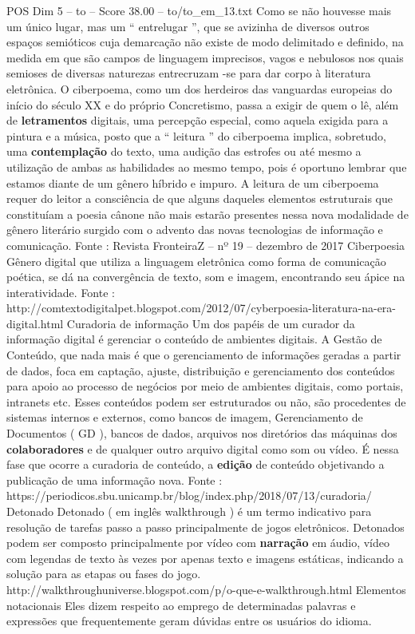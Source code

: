 \begin{textsample}{POS Dim 5 – to – Score 38.00 – to/to\_em\_13.txt}
Como se não houvesse mais um único lugar, mas um “ entrelugar ”, que se avizinha de diversos outros espaços semióticos cuja demarcação não existe de modo delimitado e definido, na medida em que são campos de linguagem imprecisos, vagos e nebulosos nos quais semioses de diversas naturezas entrecruzam -se para dar corpo à literatura eletrônica.
O ciberpoema, como um dos herdeiros das vanguardas europeias do início do século XX e do próprio Concretismo, passa a exigir de quem o lê, além de \textbf{letramentos} digitais, uma percepção especial, como aquela exigida para a pintura e a música, posto que a “ leitura ” do ciberpoema implica, sobretudo, uma \textbf{contemplação} do texto, uma audição das estrofes ou até mesmo a utilização de ambas as habilidades ao mesmo tempo, pois é oportuno lembrar que estamos diante de um gênero híbrido e impuro.
A leitura de um ciberpoema requer do leitor a consciência de que alguns daqueles elementos estruturais que constituíam a poesia cânone não mais estarão presentes nessa nova modalidade de gênero literário surgido com o advento das novas tecnologias de informação e comunicação.
Fonte : Revista FronteiraZ – nº 19 – dezembro de 2017 Ciberpoesia Gênero digital que utiliza a linguagem eletrônica como forma de comunicação poética, se dá na convergência de texto, som e imagem, encontrando seu ápice na interatividade.
Fonte : http://comtextodigitalpet.blogspot.com/2012/07/cyberpoesia-literatura-na-era-digital.html Curadoria de informação Um dos papéis de um curador da informação digital é gerenciar o conteúdo de ambientes digitais.
A Gestão de Conteúdo, que nada mais é que o gerenciamento de informações geradas a partir de dados, foca em captação, ajuste, distribuição e gerenciamento dos conteúdos para apoio ao processo de negócios por meio de ambientes digitais, como portais, intranets etc.
Esses conteúdos podem ser estruturados ou não, são procedentes de sistemas internos e externos, como bancos de imagem, Gerenciamento de Documentos ( GD ), bancos de dados, arquivos nos diretórios das máquinas dos \textbf{colaboradores} e de qualquer outro arquivo digital como som ou vídeo.
É nessa fase que ocorre a curadoria de conteúdo, a \textbf{edição} de conteúdo objetivando a publicação de uma informação nova.
Fonte : https://periodicos.sbu.unicamp.br/blog/index.php/2018/07/13/curadoria/ Detonado Detonado ( em inglês walkthrough ) é um termo indicativo para resolução de tarefas passo a passo principalmente de jogos eletrônicos.
Detonados podem ser composto principalmente por vídeo com \textbf{narração} em áudio, vídeo com legendas de texto às vezes por apenas texto e imagens estáticas, indicando a solução para as etapas ou fases do jogo. http://walkthroughuniverse.blogspot.com/p/o-que-e-walkthrough.html Elementos notacionais Eles dizem respeito ao emprego de determinadas palavras e expressões que frequentemente geram dúvidas entre os usuários do idioma.

\end{textsample}

